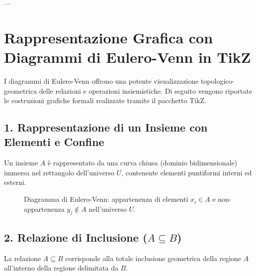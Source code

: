 ---

\section{Rappresentazione Grafica con Diagrammi di Eulero-Venn in TikZ}

I diagrammi di Eulero-Venn offrono una potente visualizzazione topologico-geometrica delle relazioni e operazioni insiemistiche. Di seguito vengono riportate le costruzioni grafiche formali realizzate tramite il pacchetto \textsf{TikZ}.

\subsection{1. Rappresentazione di un Insieme con Elementi e Confine}
Un insieme $A$ è rappresentato da una curva chiusa (dominio bidimensionale) immersa nel rettangolo dell'universo $U$, contenente elementi puntiformi interni ed esterni.

\begin{figure}[H]
\centering
{}
\caption{Diagramma di Eulero-Venn: appartenenza di elementi $x_i \in A$ e non-appartenenza $y_j \notin A$ nell'universo $U$.}
\label{fig:venn_insieme}
\end{figure}

\subsection{2. Relazione di Inclusione (\texorpdfstring{$A \subseteq B$}{A sottoinsieme di B})}
La relazione $A \subseteq B$ corrisponde alla totale inclusione geometrica della regione $A$ all'interno della regione delimitata da $B$.

